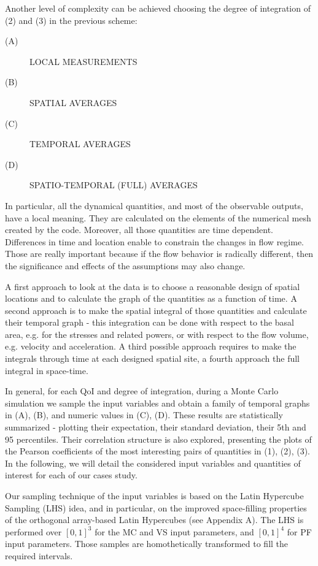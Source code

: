 \documentclass{article}
\begin{document}
Another level of complexity can be achieved choosing the degree of integration of (2) and (3) in the previous scheme:
\begin{description}
  \item[(A)] LOCAL MEASUREMENTS
  \item[(B)] SPATIAL AVERAGES
  \item[(C)] TEMPORAL AVERAGES
  \item[(D)] SPATIO-TEMPORAL (FULL) AVERAGES
\end{description}

In particular, all the dynamical quantities, and most of the observable outputs, have a local meaning. They are calculated on the elements of the numerical mesh created by the code. Moreover, all those quantities are time dependent. Differences in time and location enable to constrain the changes in flow regime. Those are really important because if the flow behavior is radically different, then the significance and effects of the assumptions may also change.

A first approach to look at the data is to choose a reasonable design of spatial locations and to calculate the graph of the quantities as a function of time. A second approach is to make the spatial integral of those quantities and calculate their temporal graph - this integration can be done with respect to the basal area, e.g. for the stresses and related powers, or with respect to the flow volume, e.g. velocity and acceleration. A third possible approach requires to make the integrals through time at each designed spatial site, a fourth approach the full integral in space-time.

In general, for each QoI and degree of integration, during a Monte Carlo simulation we sample the input variables and obtain a family of temporal graphs in (A), (B), and numeric values in (C), (D). These results are statistically summarized - plotting their expectation, their standard deviation, their 5th and 95 percentiles. Their correlation structure is also explored, presenting the plots of the Pearson coefficients of the most interesting pairs of quantities in (1), (2), (3). In the following, we will detail the considered input variables and quantities of interest for each of our cases study.

Our sampling technique of the input variables is based on the Latin Hypercube Sampling (LHS) idea, and in particular, on the improved space-filling properties of the orthogonal array-based Latin Hypercubes (see Appendix A). The LHS is performed over $[0,1]^3$ for the MC and VS input parameters, and $[0,1]^4$ for PF input parameters. Those samples are homothetically transformed to fill the required intervals.
\end{document}
